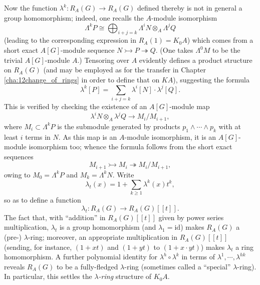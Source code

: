\documentclass[openany,leqno]{book}  %
\newcommand{\id}{\mathrm{id}} %
\begin{document}
Now the function $\lambda^k \colon R_A(G) \longrightarrow R_A(G)$ defined thereby is not in general a group homomorphism; indeed, one recalls the $A$-module isomorphism
\[\Lambda^kP \cong \bigoplus_{i+j=k} \Lambda^i N\otimes_A \Lambda^jQ\]
(leading to the corresponding expression in $R_A(1) = K_0A$) which comes from a short exact $A[G]$-module sequence $N \rightarrowtail P \twoheadrightarrow Q$. (One takes $\Lambda^0M$ to be the trivial $A[G]$-module $A$.) Tensoring over $A$ evidently defines a product structure on $R_A(G)$ (and may be employed as for the transfer in Chapter \ref{cha:12change_of_rings} in order to define that on $KA$), suggesting the formula 
\[\lambda^k[P] = \sum_{i+j=k} \lambda^i[N] \cdot \lambda^j[Q].\]
This is verified by checking the existence of an $A[G]$-module map
\[\lambda^iN \otimes_A \lambda^jQ\longrightarrow M_i/M_{i+1},\]
where $M_i \subset \Lambda^kP$ is the submodule generated by products $p_1\wedge\cdots \wedge p_k$ with at least $i$ terms in $N$. As this map is an $A$-module isomorphism, it is an $A[G]$-module isomorphism too; whence the
formula follows from the short exact sequences
\[M_{i+1}\rightarrowtail M_{i} \twoheadrightarrow M_{i}/M_{i+1},\]
owing to $M_0 = \Lambda^kP$ and $M_k = \Lambda^kN$. Write
\[\lambda_t(x) =1+\sum_{k\geqslant 1} \lambda^k(x) t^k , \]
so as to define a function
\[\lambda_t \colon R_A(G)\longrightarrow R_A(G)[[t]].\]
The fact that, with ``addition'' in $R_A(G)[[t]]$ given by power series multiplication, $\lambda_t$ is a group homomorphism (and $\lambda_1 = \id$) makes $R_A(G)$ a (pre-) $\lambda$-ring; moreover, an appropriate multiplication in $R_A(G)[[t]]$ (sending, for instance, $(1+xt)$ and $(1+yt)$ to $(1+x\cdot yt)$) makes $\lambda_t$ a ring homomorphism. A further polynomial identity for $\lambda^h\circ \lambda^k$ in terms of $\lambda^{1}, \cdots, \lambda^{hk}$ reveals $R_A(G)$ to be a fully-fledged $\lambda$-ring (sometimes called a ``special'' $\lambda$-ring). In particular, this settles the {\em $\lambda$-ring}  structure of $K_0A$.
\end{document}
